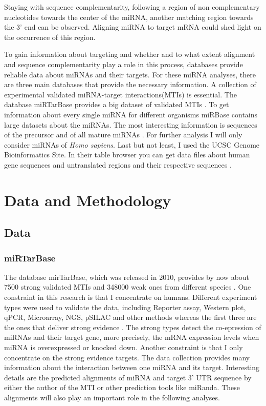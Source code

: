 \documentclass[12pt]{article}
\begin{document}
Staying with sequence complementarity, following a region of non complementary nucleotides towards the center of the miRNA, another matching region towards the 3' end can be observed. Aligning miRNA to target mRNA could shed light on the occurrence of this region. 

To gain information about targeting and whether and to what extent alignment and sequence complementarity play a role in this process, databases provide reliable data about miRNAs and their targets. 
For these miRNA analyses, there are three main databases that provide the necessary information. A collection of experimental validated miRNA-target interactions(MTIs) is essential. The database miRTarBase provides a big dataset of validated MTIs \cite{Hsu}. To get information about every single miRNA for different organisms miRBase contains large datasets about the miRNAs. The most interesting information is sequences of the precursor and of all mature miRNAs \cite{mirbase}. For further analysis I will only consider miRNAs of \textit{Homo sapiens}. Last but not least, I used the UCSC Genome Bioinformatics Site. In their table browser you can get data files about human gene sequences and untranslated regions and their respective sequences \cite{ucsc}.
  
\vspace{1.5cm}


\section{Data and Methodology}

 
\subsection{Data} 
\subsubsection{miRTarBase}
The database mirTarBase, which was released in 2010, provides by now about 7500 strong validated MTIs and 348000 weak ones from different species \cite{Chou}. One constraint in this research is that I concentrate on humans. Different experiment types were used to validate the data, including Reporter assay, Western plot, qPCR, Microarray, NGS, pSILAC and other methods whereas the first three are the ones that deliver strong evidence \cite{Hsu}. The strong types detect the co-epression of miRNAs and their target gene, more precisely, the mRNA expression levels when miRNA is overexpressed or knocked down. Another constraint is that I only concentrate on the strong evidence targets. The data collection provides many information about the interaction between one miRNA and its target. Interesting details are the predicted alignments of miRNA and target 3' UTR sequence by either the author of the MTI or other prediction tools like miRanda. These alignments will also play an important role in the following analyses. 
\end{document}
